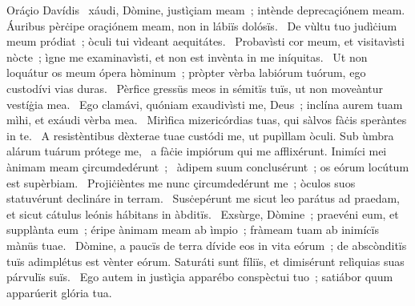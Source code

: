 { Oráçio Davídis}
{%
~xáudi, Dòmine, justìçiam meam~; intènde deprecaçiónem meam. Áuribus pèrċipe oraçiónem meam, non in lábiïs dolósïs. 
~De vùltu tuo judìċium meum pródiat~; òculi tui vìdeant aequitátes. 
~Probavìsti cor meum, et visitavìsti nòcte~; ìgne me examinavìsti, et non est invènta in me iníquitas. 
~Ut non loquátur os meum ópera hòminum~; pròpter vèrba labiórum tuórum, ego custodívi vias duras. 
~Pèrfice gressüs meos in sémitïs tuïs, ut non moveàntur vestíġia mea. 
~Ego clamávi, quóniam exaudivìsti me, Deus~; inclína aurem tuam mìhi, et exáudi vèrba mea. 
~Mirìfica mizericórdias tuas, qui sàlvos fàċis speràntes in te. 
~A resistèntibus dèxterae tuae custódi me, ut pupìllam òculi. Sub ùmbra alárum tuárum prótege me, 
~a fàċie impiórum qui me afflixérunt. Inimíci mei ànimam meam çircumdedérunt~; 
~àdipem suum conclusérunt~; os eórum locútum est supèrbiam. 
~Projiċièntes me nunc çircumdedérunt me~; òculos suos statuvérunt declináre in terram. 
~Susċepérunt me sicut leo parátus ad praedam, et sicut cátulus leónis hábitans in àbditïs. 
~Exsùrge, Dòmine~; praevéni eum, et supplànta eum~; éripe ànimam meam ab ìmpio~; fràmeam tuam ab inimícïs mànüs tuae. 
~Dòmine, a paucïs de terra dívide eos in vita eórum~; de abscònditïs tuïs adimplétus est vènter eórum. Saturáti sunt fíliïs, et dimisérunt relìquias suas párvulïs suïs. 
~Ego autem in justìçia apparébo conspèctui tuo~; satiábor quum apparúerit glória tua. 
}
